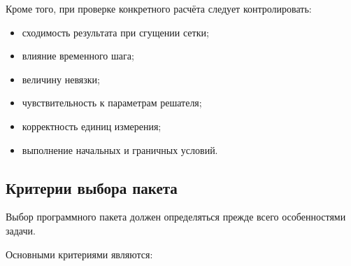 Кроме того, при проверке конкретного расчёта следует контролировать:
\begin{itemize}
	\item сходимость результата при сгущении сетки;
	\item влияние временного шага;
	\item величину невязки;
	\item чувствительность к параметрам решателя;
	\item корректность единиц измерения;
	\item выполнение начальных и граничных условий.
\end{itemize}

\subsection{Критерии выбора пакета}

Выбор программного пакета должен определяться прежде всего особенностями задачи.

Основными критериями являются:

